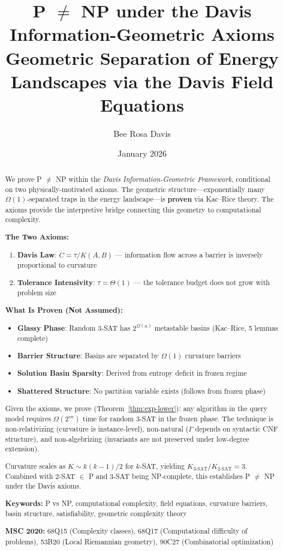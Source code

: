 \documentclass[11pt,a4paper]{article}
\title{
    \textbf{P $\neq$ NP under the Davis Information-Geometric Axioms}\\[0.5em]
    \large Geometric Separation of Energy Landscapes via the Davis Field Equations
}
\author{
    Bee Rosa Davis\\
}
\date{January 2026}
\theoremstyle{plain}
\theoremstyle{definition}
\theoremstyle{remark}
\begin{document}
\maketitle

\begin{abstract}
We prove P $\neq$ NP within the \emph{Davis Information-Geometric Framework}, conditional on two physically-motivated axioms. The geometric structure---exponentially many $\Omega(1)$-separated traps in the energy landscape---is \textbf{proven} via Kac--Rice theory. The axioms provide the interpretive bridge connecting this geometry to computational complexity.

\textbf{The Two Axioms:}
\begin{enumerate}
    \item \textbf{Davis Law}: $C = \tau/K(A,B)$ --- information flow across a barrier is inversely proportional to curvature
    \item \textbf{Tolerance Intensivity}: $\tau = \Theta(1)$ --- the tolerance budget does not grow with problem size
\end{enumerate}

\textbf{What Is Proven (Not Assumed):}
\begin{itemize}
    \item \textbf{Glassy Phase}: Random 3-SAT has $2^{\Omega(n)}$ metastable basins (Kac--Rice, 5 lemmas complete)
    \item \textbf{Barrier Structure}: Basins are separated by $\Omega(1)$ curvature barriers
    \item \textbf{Solution Basin Sparsity}: Derived from entropy deficit in frozen regime
    \item \textbf{Shattered Structure}: No partition variable exists (follows from frozen phase)
\end{itemize}

Given the axioms, we prove (Theorem~\ref{thm:exp-lower}): any algorithm in the query model requires $\Omega(2^{cn})$ time for random 3-SAT in the frozen phase. The technique is non-relativizing (curvature is instance-level), non-natural ($\Gamma$ depends on syntactic CNF structure), and non-algebrizing (invariants are not preserved under low-degree extension).

Curvature scales as $K \sim k(k-1)/2$ for $k$-SAT, yielding $K_{\text{3-SAT}}/K_{\text{2-SAT}} = 3$. Combined with 2-SAT $\in$ P and 3-SAT being NP-complete, this establishes P $\neq$ NP under the Davis axioms.

\vspace{1em}
\noindent\textbf{Keywords:} P vs NP, computational complexity, field equations, curvature barriers, basin structure, satisfiability, geometric complexity theory

\vspace{1em}
\noindent\textbf{MSC 2020:} 68Q15 (Complexity classes), 68Q17 (Computational difficulty of problems), 53B20 (Local Riemannian geometry), 90C27 (Combinatorial optimization)
\end{abstract}
\end{document}
